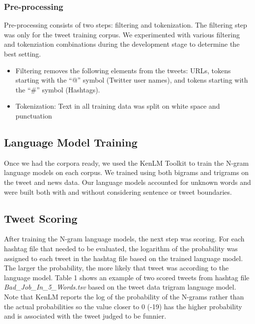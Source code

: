 \documentclass[11pt,a4paper]{article}
\begin{document}
\subsubsection{Pre-processing}

Pre-processing consists of two steps: filtering and tokenization. The filtering step was only for the tweet training corpus. 
We experimented with various filtering and tokenziation combinations during the development stage to determine the best setting. 

\begin{itemize}
\item Filtering removes the following elements from the tweets:
URLs, tokens starting with the ``@'' symbol (Twitter user names),
and tokens starting with the ``\#'' symbol (Hashtags). 
\item Tokenization: Text in all training data was split on white space and punctuation
\end{itemize}

\subsection{Language Model Training}

Once we had the corpora ready, we used the KenLM Toolkit to train the N-gram language models on each corpus. 
We trained using both bigrams and trigrams on
the tweet and news data. Our language models accounted for unknown words and were built both with and 
without considering sentence or tweet boundaries. 

\subsection{Tweet Scoring}

After training the N-gram language models, the next step was scoring. 
For each hashtag file that needed 
to be evaluated, the logarithm of the probability 
was assigned to each tweet in the 
hashtag file based on the trained language model.
The larger the probability, the more likely that tweet was according 
to the language model. Table 1 shows an example of two 
scored tweets from hashtag file \textit{Bad\_Job\_In\_5\_Words.tsv} 
based on the tweet data trigram language model.
Note that KenLM reports the log of the probability of the N-grams 
rather than the actual probabilities so the value closer to 0 (-19) has
the higher probability and is 
associated with the tweet judged to be funnier.
\end{document}
